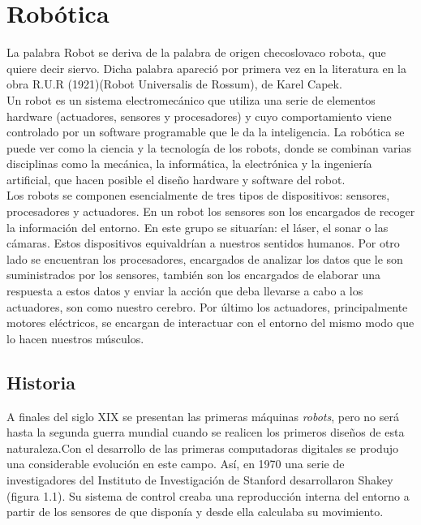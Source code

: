 \section{Robótica}
\label{sec:robotica}

La palabra Robot se deriva de la palabra de origen checoslovaco robota, que quiere decir siervo. Dicha palabra apareció por primera vez en la literatura en la obra R.U.R (1921)(Robot Universalis de Rossum), de Karel Capek.\\

Un robot es un sistema electromecánico que utiliza una serie de elementos hardware
(actuadores, sensores y procesadores) y cuyo comportamiento viene controlado por un
software programable que le da la inteligencia. La robótica se puede ver como la ciencia
y la tecnología de los robots, donde se combinan varias disciplinas como la mecánica, la
informática, la electrónica y la ingeniería artificial, que hacen posible el diseño hardware y software del robot.\\

Los robots se componen esencialmente de tres tipos de dispositivos: sensores,
procesadores y actuadores. En un robot los sensores son los encargados de recoger
la información del entorno. En este grupo se situarían: el láser, el sonar o las
cámaras. Estos dispositivos equivaldrían a nuestros sentidos humanos. Por otro lado se
encuentran los procesadores, encargados de analizar los datos que le son suministrados
por los sensores, también son los encargados de elaborar una respuesta a estos datos y
enviar la acción que deba llevarse a cabo a los actuadores, son como nuestro cerebro.
Por último los actuadores, principalmente motores eléctricos, se encargan de interactuar
con el entorno del mismo modo que lo hacen nuestros músculos.\\


\subsection{Historia}
\label{subsec:historia}

A finales del siglo XIX se presentan las primeras máquinas \textit{robots}, pero no
será hasta la segunda guerra mundial cuando se realicen los primeros diseños de esta
naturaleza.Con el desarrollo de las primeras computadoras digitales se produjo una
considerable evolución en este campo. Así, en 1970 una serie de investigadores del
Instituto de Investigación de Stanford desarrollaron Shakey (figura 1.1). Su sistema de
control creaba una reproducción interna del entorno a partir de los sensores de que
disponía y desde ella calculaba su movimiento.\\

